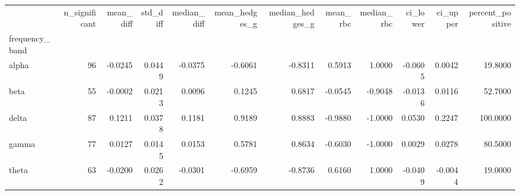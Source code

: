 \begin{tabular}{lrrrrrrrrrrr}
\toprule
 & n\_significant & mean\_diff & std\_diff & median\_diff & mean\_hedges\_g & median\_hedges\_g & mean\_rbc & median\_rbc & ci\_lower & ci\_upper & percent\_positive \\
frequency\_band &  &  &  &  &  &  &  &  &  &  &  \\
\midrule
alpha & 96 & -0.0245 & 0.0449 & -0.0375 & -0.6061 & -0.8311 & 0.5913 & 1.0000 & -0.0605 & 0.0042 & 19.8000 \\
beta & 55 & -0.0002 & 0.0213 & 0.0096 & 0.1245 & 0.6817 & -0.0545 & -0.9048 & -0.0136 & 0.0116 & 52.7000 \\
delta & 87 & 0.1211 & 0.0378 & 0.1181 & 0.9189 & 0.8883 & -0.9880 & -1.0000 & 0.0530 & 0.2247 & 100.0000 \\
gamma & 77 & 0.0127 & 0.0145 & 0.0153 & 0.5781 & 0.8634 & -0.6030 & -1.0000 & 0.0029 & 0.0278 & 80.5000 \\
theta & 63 & -0.0200 & 0.0262 & -0.0301 & -0.6959 & -0.8736 & 0.6160 & 1.0000 & -0.0409 & -0.0044 & 19.0000 \\
\bottomrule
\end{tabular}